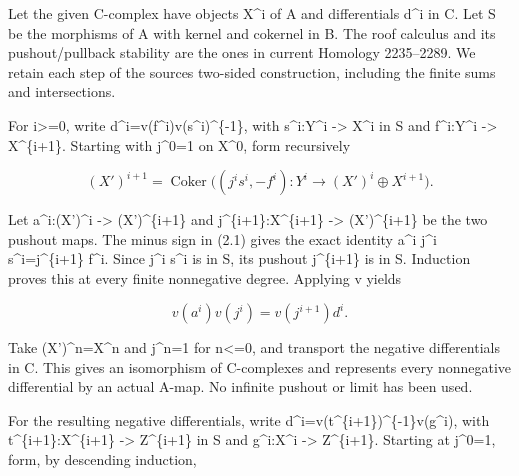 Let the given C-complex have objects X\^{}i of A and differentials d\^{}i in C. Let S be the morphisms of A with kernel and cokernel in B. The roof calculus and its pushout/\allowbreak{}pullback stability are the ones in current Homology 2235–\allowbreak{}2289. We retain each step of the source\textquotesingle s two-sided construction,\allowbreak{} including the finite sums and intersections.

For i>\allowbreak{}=0,\allowbreak{} write d\textasciicircum{}i\allowbreak{}=v(f\textasciicircum{}i)\allowbreak{}v(s\textasciicircum{}i)\allowbreak{}\textasciicircum{}\{-1\},\allowbreak{} with s\textasciicircum{}i:\allowbreak{}Y\textasciicircum{}i \allowbreak{}-> X\^{}i in S and f\textasciicircum{}i:\allowbreak{}Y\textasciicircum{}i \allowbreak{}-> X\textasciicircum{}\{i\allowbreak{}+1\}. Starting with j\textasciicircum{}0\allowbreak{}=1 on X\textasciicircum{}0,\allowbreak{} form recursively

\[
 (X')^{i+1}
   =\operatorname{Coker}\big((j^is^i,-f^i):
             Y^i\longrightarrow (X')^i\oplus X^{i+1}\big).
                                                        \tag{2.1}
\]

Let a\textasciicircum{}i:\allowbreak{}(X')\allowbreak{}\textasciicircum{}i \allowbreak{}-> (X')\allowbreak{}\textasciicircum{}\{i\allowbreak{}+1\} and j\textasciicircum{}\{i\allowbreak{}+1\}:\allowbreak{}X\textasciicircum{}\{i\allowbreak{}+1\} \allowbreak{}-> (X')\allowbreak{}\textasciicircum{}\{i\allowbreak{}+1\} be the two pushout maps. The minus sign in (2.1)\allowbreak{} gives the exact identity a\^{}i j\^{}i s\textasciicircum{}i\allowbreak{}=j\textasciicircum{}\{i\allowbreak{}+1\} f\^{}i. Since j\^{}i s\^{}i is in S,\allowbreak{} its pushout j\textasciicircum{}\{i\allowbreak{}+1\} is in S. Induction proves this at every finite nonnegative degree. Applying v yields

\[
 v(a^i)v(j^i)=v(j^{i+1})d^i.
\]

Take (X')\allowbreak{}\textasciicircum{}n\allowbreak{}=X\textasciicircum{}n and j\textasciicircum{}n\allowbreak{}=1 for n<\allowbreak{}=0,\allowbreak{} and transport the negative differentials in C. This gives an isomorphism of C-complexes and represents every nonnegative differential by an actual A-map. No infinite pushout or limit has been used.

For the resulting negative differentials,\allowbreak{} write d\textasciicircum{}i\allowbreak{}=v(t\textasciicircum{}\{i\allowbreak{}+1\})\allowbreak{}\textasciicircum{}\{-1\}v(g\textasciicircum{}i)\allowbreak{},\allowbreak{} with t\textasciicircum{}\{i\allowbreak{}+1\}:\allowbreak{}X\textasciicircum{}\{i\allowbreak{}+1\} \allowbreak{}-> Z\textasciicircum{}\{i\allowbreak{}+1\} in S and g\textasciicircum{}i:\allowbreak{}X\textasciicircum{}i \allowbreak{}-> Z\textasciicircum{}\{i\allowbreak{}+1\}. Starting at j\textasciicircum{}0\allowbreak{}=1,\allowbreak{} form,\allowbreak{} by descending induction,\allowbreak{}

